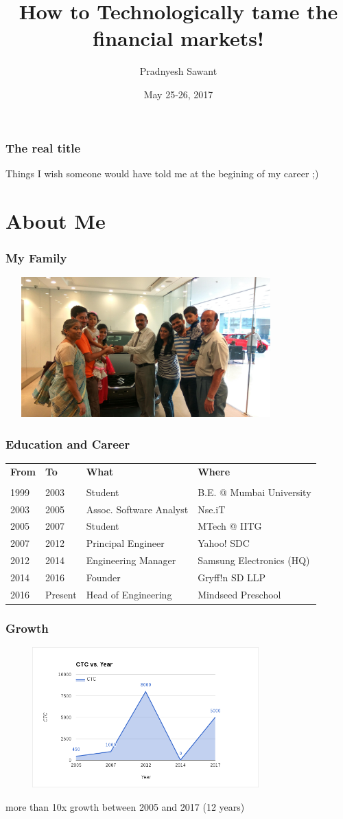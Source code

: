 \documentclass{beamer}
\title{How to Technologically tame the financial markets!}
\author{Pradnyesh Sawant}
\date{May 25-26, 2017}
\begin{document}
\frame{\titlepage}

\begin{frame}
  \frametitle{The real title}
  Things I wish someone would have told me at the begining of my career ;)
\end{frame}

\section{About Me}
\begin{frame}
  \frametitle{My Family}
  \includegraphics[height=5.4cm,width=10.8cm]{IMG_20160618_175653_HDR.jpg}
\end{frame}
\begin{frame}
  \frametitle{Education and Career}
  \begin{tabular}{ l  l  l  l }
    \textbf{From} & \textbf{To} & \textbf{What} & \textbf{Where}\\
    & & & \\
    1999 & 2003 & Student & B.E. @ Mumbai University\\
    2003 & 2005 & Assoc. Software Analyst & Nse.iT\\
    2005 & 2007 & Student & MTech @ IITG\\
    2007 & 2012 & Principal Engineer & Yahoo! SDC\\
    2012 & 2014 & Engineering Manager & Samsung Electronics (HQ)\\
    2014 & 2016 & Founder & Gryff!n SD LLP\\
    2016 & Present & Head of Engineering & Mindseed Preschool\\
  \end{tabular}
\end{frame}
\begin{frame}
  \frametitle{Growth}
  \includegraphics[height=5.4cm,width=10.8cm]{screenshot_2017-05-19_08-08-01.png}

  more than 10x growth between 2005 and 2017 (12 years)
\end{frame}
\end{document}
